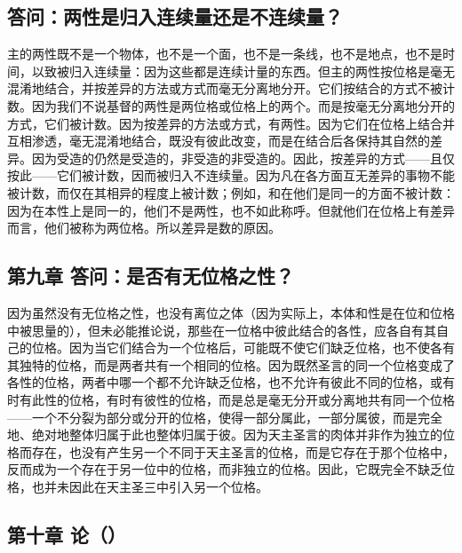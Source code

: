 
\subsection{答问：两性是归入连续量还是不连续量？}

主的两性既不是一个物体，也不是一个面，也不是一条线，也不是地点，也不是时间，以致被归入连续量：因为这些都是连续计量的东西。但主的两性按位格是毫无混淆地结合，并按差异的方法或方式而毫无分离地分开。它们按结合的方式不被计数。因为我们不说基督的两性是两位格或位格上的两个。而是按毫无分离地分开的方式，它们被计数。因为按差异的方法或方式，有两性。因为它们在位格上结合并互相渗透，毫无混淆地结合，既没有彼此改变，而是在结合后各保持其自然的差异。因为受造的仍然是受造的，非受造的非受造的。因此，按差异的方式——且仅按此——它们被计数，因而被归入不连续量。因为凡在各方面互无差异的事物不能被计数，而仅在其相异的程度上被计数；例如，和在他们是同一的方面不被计数：因为在本性上是同一的，他们不是两性，也不如此称呼。但就他们在位格上有差异而言，他们被称为两位格。所以差异是数的原因。\par


\subsection{第九章 答问：是否有无位格之性？}

因为虽然没有无位格之性，也没有离位之体（因为实际上，本体和性是在位和位格中被思量的），但未必能推论说，那些在一位格中彼此结合的各性，应各自有其自己的位格。因为当它们结合为一个位格后，可能既不使它们缺乏位格，也不使各有其独特的位格，而是两者共有一个相同的位格。因为既然圣言的同一个位格变成了各性的位格，两者中哪一个都不允许缺乏位格，也不允许有彼此不同的位格，或有时有此性的位格，有时有彼性的位格，而是总是毫无分开或分离地共有同一个位格——一个不分裂为部分或分开的位格，使得一部分属此，一部分属彼，而是完全地、绝对地整体归属于此也整体归属于彼。因为天主圣言的肉体并非作为独立的位格而存在，也没有产生另一个不同于天主圣言的位格，而是它存在于那个位格中，反而成为一个存在于另一位中的位格，而非独立的位格。因此，它既完全不缺乏位格，也并未因此在天主圣三中引入另一个位格。\par


\subsection{第十章 论（）}

